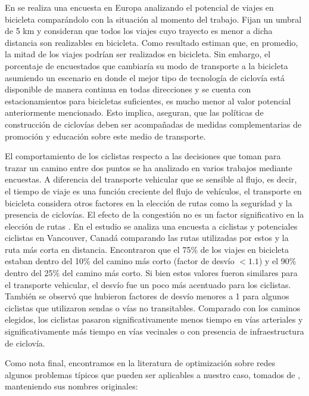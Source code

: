   En \textcite{shwe2014} se realiza una encuesta en Europa analizando el potencial de viajes en bicicleta comparándolo con la situación al momento del trabajo. Fijan un umbral de 5 km y consideran que todos los viajes cuyo trayecto es menor a dicha distancia son realizables en bicicleta. Como resultado estiman que, en promedio, la mitad de los viajes podrían ser realizados en bicicleta. Sin embargo, el porcentaje de encuestados que cambiaría su modo de transporte a la bicicleta asumiendo un escenario en donde el mejor tipo de tecnología de ciclovía está disponible de manera continua en todas direcciones y se cuenta con estacionamientos para bicicletas suficientes, es mucho menor al valor potencial anteriormente mencionado. Esto implica, aseguran, que las políticas de construcción de ciclovías deben ser acompañadas de medidas complementarias de promoción y educación sobre este medio de transporte.


  El comportamiento de los ciclistas respecto a las decisiones que toman para trazar un camino entre dos puntos se ha analizado en varios trabajos mediante encuestas. A diferencia del transporte vehicular que se sensible al flujo, es decir, el tiempo de viaje es una función creciente del flujo de vehículos, el transporte en bicicleta considera otros factores en la elección de rutas como la seguridad y la presencia de ciclovías. El efecto de la congestión no es un factor significativo en la elección de rutas \parencite{broach2012}. En el estudio \textcite{winters2010} se analiza una encuesta a ciclistas y potenciales ciclistas en Vancouver, Canadá comparando las rutas utilizadas por estos y la ruta más corta en distancia. Encontraron que el 75\% de los viajes en bicicleta estaban dentro del 10\% del camino más corto (factor de desvío $< 1.1$) y el 90\% dentro del 25\% del camino más corto. Si bien estos valores fueron similares para el transporte vehicular, el desvío fue un poco más acentuado para los ciclistas. También se observó que hubieron factores de desvío menores a 1 para algunos ciclistas que utilizaron sendas o vías no transitables. Comparado con los caminos elegidos, los ciclistas pasaron significativamente menos tiempo en vías arteriales y significativamente más tiempo en vías vecinales o con presencia de infraestructura de ciclovía.


  Como nota final, encontramos en la literatura de optimización sobre redes algunos problemas típicos que pueden ser aplicables a nuestro caso, tomados de \textcite{crainic2021}, manteniendo sus nombres originales:

